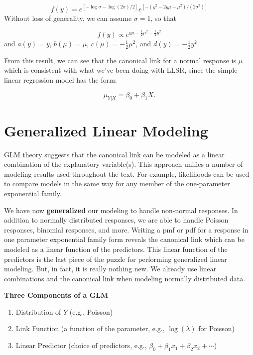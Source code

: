 \documentclass[
]{krantz}
\providecommand{\tightlist}{%
  \setlength{\itemsep}{0pt}\setlength{\parskip}{0pt}}
\begin{document}
\[
f(y)=e^{[-\log{\sigma}-\log(2\pi)/2]}{e^{[-{(y^2-2y\mu +\mu^2)}/{(2\sigma^2)}]}}
\]
Without loss of generality, we can assume \(\sigma=1\), so that

\[
f(y) \propto e^{y\mu - \frac{1}{2} \mu^2 - \frac{1}{2} y^2}
\]
and \(a(y)=y\), \(b(\mu)=\mu\), \(c(\mu)= -\frac{1}{2}\mu^2\), and \(d(y) = - \frac{1}{2} y^2\).

From this result, we can see that the canonical link for a normal response is \(\mu\) which is consistent with what we've been doing with LLSR, since the simple linear regression model has the form:

\[ \mu_{Y|X} = \beta_0 + \beta_1X. \]

\hypertarget{generalized-linear-modeling}{%
\section{Generalized Linear Modeling}\label{generalized-linear-modeling}}

GLM theory suggests that the canonical link can be modeled as a linear combination of the explanatory variable(s). This approach unifies a number of modeling results used throughout the text. For example, likelihoods can be used to compare models in the same way for any member of the one-parameter exponential family.

We have now \textbf{generalized} our modeling to handle non-normal responses. In addition to normally distributed responses, we are able to handle Poisson responses, binomial responses, and more. Writing a pmf or pdf for a response in one parameter exponential family form reveals the canonical link which can be modeled as a linear function of the predictors. This linear function of the predictors is the last piece of the puzzle for performing generalized linear modeling. But, in fact, it is really nothing new. We already use linear combinations and the canonical link when modeling normally distributed data.

\textbf{Three Components of a GLM}

\begin{enumerate}
\def\labelenumi{\arabic{enumi}.}
\tightlist
\item
  Distribution of \(Y\) (e.g., Poisson)
\item
  Link Function (a function of the parameter, e.g., \(\log(\lambda)\) for Poisson)
\item
  Linear Predictor (choice of predictors,
  e.g., \(\beta_0 + \beta_1 x_1 + \beta_2 x_2 + \cdots\))
\end{enumerate}
\end{document}
